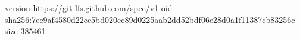version https://git-lfs.github.com/spec/v1
oid sha256:7ee9af4580d22cc5bd020ec89d0225aab2dd52bdf06e28d0a1f11387cb83256c
size 385461
